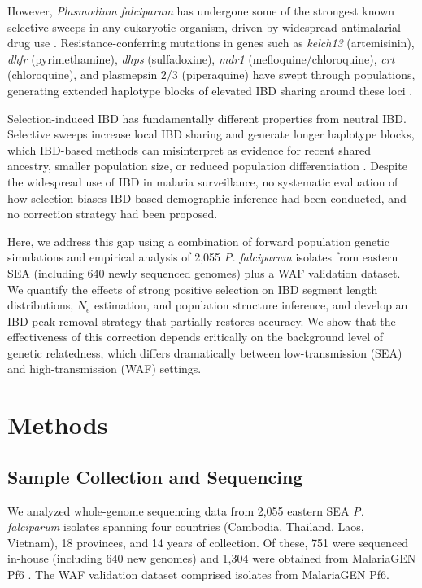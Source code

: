 \documentclass[11pt]{article}
\begin{document}
However, \textit{Plasmodium falciparum} has undergone some of the strongest known selective sweeps in any eukaryotic organism, driven by widespread antimalarial drug use \citep{ariey2014molecular, miotto2015genetic, hamilton2017evolution}. Resistance-conferring mutations in genes such as \textit{kelch13} (artemisinin), \textit{dhfr} (pyrimethamine), \textit{dhps} (sulfadoxine), \textit{mdr1} (mefloquine/chloroquine), \textit{crt} (chloroquine), and plasmepsin 2/3 (piperaquine) have swept through populations, generating extended haplotype blocks of elevated IBD sharing around these loci \citep{amato2017genetic, parobek2017partner}.

Selection-induced IBD has fundamentally different properties from neutral IBD. Selective sweeps increase local IBD sharing and generate longer haplotype blocks, which IBD-based methods can misinterpret as evidence for recent shared ancestry, smaller population size, or reduced population differentiation \citep{charlesworth2009effective}. Despite the widespread use of IBD in malaria surveillance, no systematic evaluation of how selection biases IBD-based demographic inference had been conducted, and no correction strategy had been proposed.

Here, we address this gap using a combination of forward population genetic simulations and empirical analysis of 2,055 \textit{P. falciparum} isolates from eastern SEA (including 640 newly sequenced genomes) plus a WAF validation dataset. We quantify the effects of strong positive selection on IBD segment length distributions, $N_e$ estimation, and population structure inference, and develop an IBD peak removal strategy that partially restores accuracy. We show that the effectiveness of this correction depends critically on the background level of genetic relatedness, which differs dramatically between low-transmission (SEA) and high-transmission (WAF) settings.

\section{Methods}

\subsection{Sample Collection and Sequencing}

We analyzed whole-genome sequencing data from 2,055 eastern SEA \textit{P. falciparum} isolates spanning four countries (Cambodia, Thailand, Laos, Vietnam), 18 provinces, and 14 years of collection. Of these, 751 were sequenced in-house (including 640 new genomes) and 1,304 were obtained from MalariaGEN Pf6 \citep{malariagenomicepidemiology2021open}. The WAF validation dataset comprised isolates from MalariaGEN Pf6.
\end{document}
